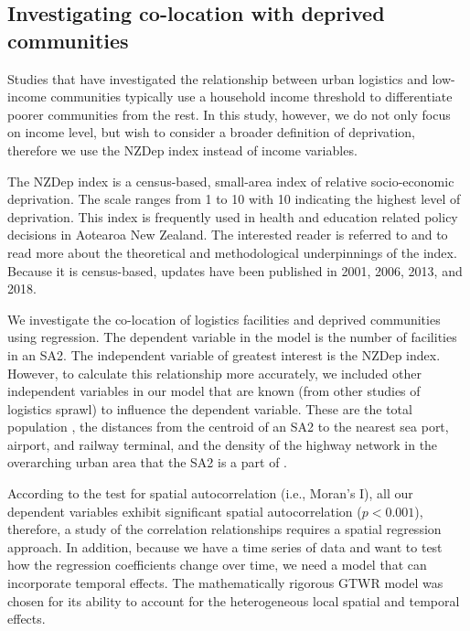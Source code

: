 \documentclass[3p, a4paper, authoryear, 11pt, fleqn, review]{elsarticle}
\newcommand{\nmt}[1]{{\color{ForestGreen}{~(nmt: #1)}}}
\begin{document}
\subsection{Investigating co-location with deprived communities} 

Studies that have investigated the relationship between urban logistics and low-income communities typically use a household income threshold to differentiate poorer communities from the rest. In this study, however, we do not only focus on income level, but wish to consider a broader definition of deprivation, therefore we use the \ac{NZDep} index instead of income variables. 

The \ac{NZDep} index is a census-based, small-area index of relative socio-economic deprivation. The scale ranges from 1 to 10 with 10 indicating the highest level of deprivation. This index is frequently used in health and education related policy decisions in Aotearoa New Zealand. The interested reader is referred to \nmt{xx} and \nmt{xx} to read more about the theoretical and methodological underpinnings of the index. Because it is census-based, updates have been published in 2001, 2006, 2013, and 2018. 




We investigate the co-location of logistics facilities and deprived communities using regression. The dependent variable in the model is the number of facilities in an \ac{SA2}. The independent variable of greatest interest is the \ac{NZDep} index. However, to calculate this relationship more accurately, we included other independent variables in our model that are known (from other studies of logistics sprawl) to influence the dependent variable. These are the total population \nmt{refs}, the distances from the centroid of an \ac{SA2} to the nearest sea port, airport, and railway terminal, and the density of the highway network in the overarching urban area that the \ac{SA2} is a part of \nmt{refs}. 


According to the test for spatial autocorrelation (i.e., Moran's I), all our dependent variables exhibit significant spatial autocorrelation ($p<0.001$), therefore, a study of the correlation relationships requires a spatial regression approach. In addition, because we have a time series of data and want to test how the regression coefficients change over time, we need a model that can incorporate temporal effects. The mathematically rigorous \ac{GTWR} model was chosen for its ability to account for the heterogeneous local spatial and temporal effects. 
\end{document}
